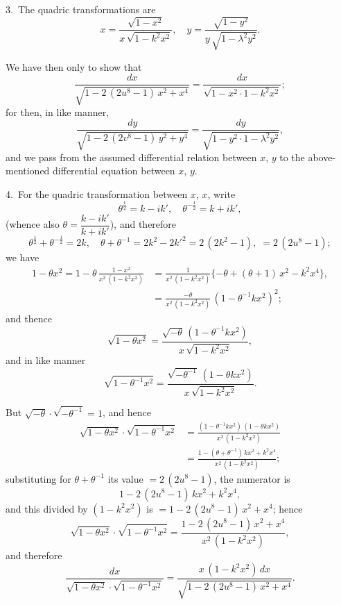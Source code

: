 \documentclass[12pt,a4paper]{article}
\theoremstyle{definition}
\begin{document}
3.\ The quadric transformations are
\[
x = \frac{\sqrt{1 - x^2}}{x\, \sqrt{1 - k^2 x^2}}, \quad
y = \frac{\sqrt{1 - y^2}}{y\, \sqrt{1 - \lambda^2 y^2}}.
\]

We have then only to show that
\[
\frac{dx}{\sqrt{1 - 2\, (2u^8 - 1)\, x^2 + x^4}}
= \frac{dx}{\sqrt{1 - x^2 \cdot 1 - k^2 x^2}};
\]
for then, in like manner,
\[
\frac{dy}{\sqrt{1 - 2\, (2v^8 - 1)\, y^2 + y^4}}
= \frac{dy}{\sqrt{1 - y^2 \cdot 1 - \lambda^2 y^2}},
\]
and we pass from the assumed differential relation between $x$, $y$ to the above-mentioned
differential equation between $x$, $y$.

4.\ For the quadric transformation between $x$, $x$, write
\[
\theta^{\frac12} = k - ik', \quad \theta^{-\frac12} = k + ik',
\]
(whence also $\theta = \dfrac{k - ik'}{k + ik'}$), and therefore
\[
\theta^{\frac12} + \theta^{-\frac12} = 2k, \quad
\theta + \theta^{-1} = 2k^2 - 2k'^2 = 2\, (2k^2 - 1), \; = 2\, (2u^8 - 1);
\]
we have
\begin{align*}
1 - \theta x^2 = 1 - \theta \, \frac{1 - x^2}{x^2\, (1 - k^2 x^2)}
&= \frac{1}{x^2\, (1 - k^2 x^2)}
\{-\theta + (\theta + 1)\, x^2 - k^2 x^4\},\\
&= \frac{-\theta}{x^2\, (1 - k^2 x^2)}\, (1 - \theta^{-1} k x^2)^2;
\end{align*}
and thence
\[
\sqrt{1 - \theta x^2} = \frac{\sqrt{-\theta}\, (1 - \theta^{-1} k x^2)}{x\, \sqrt{1 - k^2 x^2}},
\]
and in like manner
\[
\sqrt{1 - \theta^{-1} x^2} = \frac{\sqrt{-\theta^{-1}}\, (1 - \theta k x^2)}{x\, \sqrt{1 - k^2 x^2}}.
\]

But $\sqrt{-\theta} \cdot \sqrt{-\theta^{-1}} = 1$, and hence
\begin{align*}
\sqrt{1 - \theta x^2} \cdot \sqrt{1 - \theta^{-1} x^2}
&= \frac{(1 - \theta^{-1} k x^2)\, (1 - \theta k x^2)}{x^2\, (1 - k^2 x^2)}\\
&= \frac{1 - (\theta + \theta^{-1})\, k x^2 + k^2 x^4}{x^2\, (1 - k^2 x^2)};
\end{align*}
substituting for $\theta + \theta^{-1}$ its value $= 2\, (2u^8 - 1)$, the numerator is
\[
1 - 2\, (2u^8 - 1)\, k x^2 + k^2 x^4,
\]
and this divided by $(1 - k^2 x^2)$ is $= 1 - 2\, (2u^8 - 1)\, x^2 + x^4$;
hence
\[
\sqrt{1 - \theta x^2} \cdot \sqrt{1 - \theta^{-1} x^2}
= \frac{1 - 2\, (2u^8 - 1)\, x^2 + x^4}{x^2\, (1 - k^2 x^2)},
\]
and therefore
\[
\frac{dx}{\sqrt{1 - \theta x^2} \cdot \sqrt{1 - \theta^{-1} x^2}}
= \frac{x\, (1 - k^2 x^2)\, dx}{\sqrt{1 - 2\, (2u^8 - 1)\, x^2 + x^4}}.
\]
\end{document}
